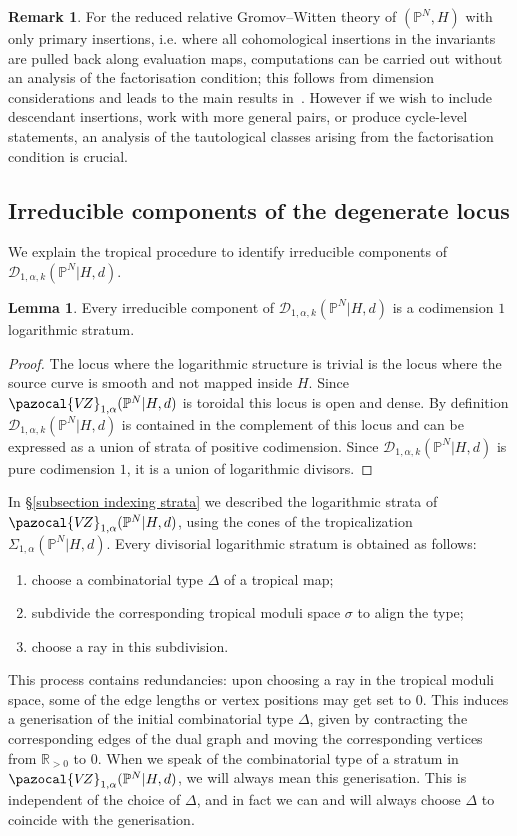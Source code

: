 \documentclass[11pt]{amsart}
\newcommand{\PP}{\mathbb P}
\newcommand{\VZ}{\pazocal{V\!Z}}
\newcommand{\Dcal}{\mathcal{D}}
\newcommand{\RR}{\mathbb{R}}
\theoremstyle{definition}
\newtheorem{lemma}[thm]{Lemma}
\theoremstyle{definition}
\newtheorem{remark}[thm]{Remark}
\begin{document}
\begin{remark} For the reduced relative Gromov--Witten theory of $(\mathbb P^N,H)$ with only primary insertions, i.e. where all cohomological insertions in the invariants are pulled back along evaluation maps, computations can be carried out without an analysis of the factorisation condition; this follows from dimension considerations and leads to the main results in~\cite{Vre}. However if we wish to include descendant insertions, work with more general pairs, or produce cycle-level statements, an analysis of the tautological classes arising from the factorisation condition is crucial.
\end{remark}

\subsection{Irreducible components of the degenerate locus} We explain the tropical procedure to identify irreducible components of $\Dcal_{1,\alpha,k}(\PP^N|H,d)$.

\begin{lemma} \label{Lemma components are logarithmic divisors} Every irreducible component of $\Dcal_{1,\alpha,k}(\PP^N|H,d)$ is a codimension $1$ logarithmic stratum.\end{lemma}

\begin{proof} The locus where the logarithmic structure is trivial is the locus where the source curve is smooth and not mapped inside $H$. Since $\VZ_{1,\alpha}(\PP^N|H,d)$ is toroidal this locus is open and dense. By definition $\Dcal_{1,\alpha,k}(\PP^N|H,d)$ is contained in the  complement of this locus and can be expressed as a union of strata of positive codimension. Since $\Dcal_{1,\alpha,k}(\PP^N|H,d)$ is pure codimension $1$, it is a union of logarithmic divisors.\end{proof}

\noindent In \S \ref{subsection indexing strata} we described the logarithmic strata of $\VZ_{1,\alpha}(\PP^N|H,d)$, using the cones of the tropicalization $\Sigma_{1,\alpha}(\PP^N|H,d)$. Every divisorial logarithmic stratum is obtained as follows:
\begin{enumerate}
\item choose a combinatorial type $\Delta$ of a tropical map;
\item subdivide the corresponding tropical moduli space $\sigma$ to align the type;
\item choose a ray in this subdivision.
\end{enumerate}
This process contains redundancies: upon choosing a ray in the tropical moduli space, some of the edge lengths or vertex positions may get set to $0$. This induces a generisation of the initial combinatorial type $\Delta$, given by contracting the corresponding edges of the dual graph and moving the corresponding vertices from $\RR_{>0}$ to $0$. When we speak of the combinatorial type of a stratum in $\VZ_{1,\alpha}(\PP^N|H,d)$, we will always mean this generisation. This is independent of the choice of $\Delta$, and in fact we can and will always choose $\Delta$ to coincide with the generisation.
\end{document}
